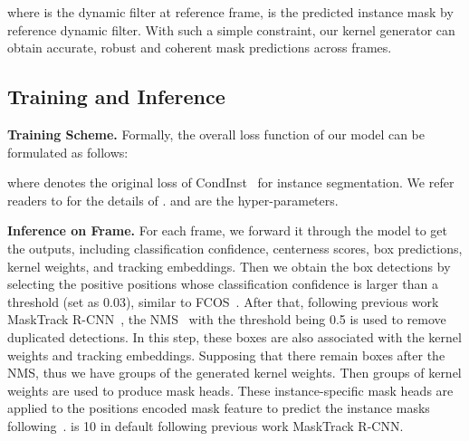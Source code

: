 \documentclass[runningheads]{llncs}
\begin{document}
where  is the dynamic filter at reference frame,  is the predicted instance mask by reference dynamic filter. With such a simple constraint, our kernel generator can obtain accurate, robust and coherent mask predictions across frames.

 


\subsection{Training and Inference} 

\noindent \textbf{Training Scheme.} Formally, the overall loss function of our model can be formulated as follows:

where  denotes the original loss of CondInst~\cite{tian2020conditional} for instance segmentation. We refer readers to \cite{tian2020conditional} for the details of .  and  are the hyper-parameters.


\noindent \textbf{Inference on Frame.} For each frame, we forward it through the model to get the outputs, including classification confidence, centerness scores, box predictions, kernel weights, and tracking embeddings. Then we obtain the box detections by selecting the positive positions whose classification confidence is larger than a threshold (set as 0.03), similar to FCOS~\cite{tian2019fcos}. After that, following previous work MaskTrack R-CNN~\cite{yang2019video}, the NMS~\cite{bolya2019yolact} with the threshold being 0.5 is used to remove duplicated detections. In this step, these boxes are also associated with the kernel weights and tracking embeddings. Supposing that there remain  boxes after the NMS, thus we have  groups of the generated kernel weights. Then  groups of kernel weights are used to produce  mask heads. These instance-specific mask heads are applied to the positions encoded mask feature to predict the instance masks following~\cite{tian2020conditional}.  is 10 in default following previous work MaskTrack R-CNN.
\end{document}
